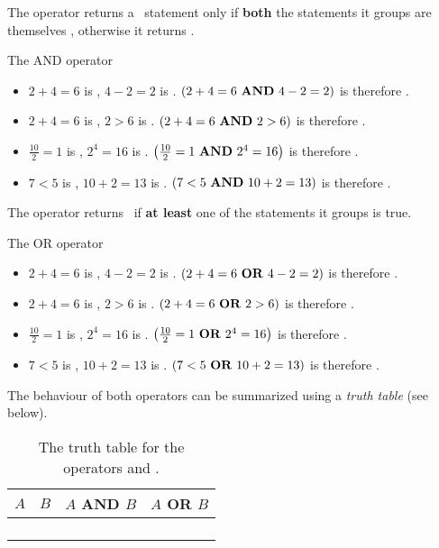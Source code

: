 The \AND{} operator returns a \true\ statement only if \textbf{both} the statements it groups are themselves \true, otherwise it returns \false.

\begin{example}{The AND operator}{}
	\begin{itemize}
		\item $2+4=6$ is \true, $4-2=2$ is \true. $\left(2+4=6\ \text{\AND{}}\ 4-2=2\right)$ is therefore \true.
		\item $2+4=6$ is \true, $2>6$ is \false. $\left(2+4=6\ \text{\AND{}}\ 2>6\right)$ is therefore \false.
		\item $\frac{10}{2}=1$ is \false, $2^{4}=16$ is \true. $\left( \frac{10}{2}=1\ \text{\AND{}}\ 2^{4}=16 \right)$ is therefore \false.
		\item $7<5$ is \false, $10+2=13$ is \false. $\left( 7<5\ \text{\textbf{AND}{}}\ 10+2=13 \right)$ is therefore \false.
	\end{itemize}
\end{example}

The \OR{} operator returns \true\ if \textbf{at least} one of the statements it groups is true.
\begin{example}{The OR operator}{}
	\begin{itemize}
		\item $2+4=6$ is \true, $4-2=2$ is \true. $\left(2+4=6\ \text{\OR{}}\ 4-2=2\right)$ is therefore \true.
		\item $2+4=6$ is \true, $2>6$ is \false. $\left(2+4=6\ \text{\OR{}}\ 2>6\right)$ is therefore \true.
		\item $\frac{10}{2}=1$ is \false, $2^{4}=16$ is \true. $\left( \frac{10}{2}=1\ \text{\OR{}}\ 2^{4}=16 \right)$ is therefore \true.
		\item $7<5$ is \false, $10+2=13$ is \false. $\left( 7<5\ \text{\textbf{OR}{}}\ 10+2=13 \right)$ is therefore \false.
	\end{itemize}
\end{example}

The behaviour of both operators can be summarized using a \emph{truth table} (see  below).
\begin{table}[H]
	\centering
	\caption{The truth table for the operators \AND{} and \OR{}.}
	\label{tab:AND_OR_truth_table}
	\begin{tabular}{llll}
		\toprule
		$A$ & $B$ & $A$ AND $B$ & $A$ OR $B$\\
		\midrule
		\true & \true & \true & \true \\
		\true & \false & \false & \true \\
		\false & \true & \false & \true \\
		\false & \false & \false & \false \\
		\midrule
	\end{tabular}
\end{table}

